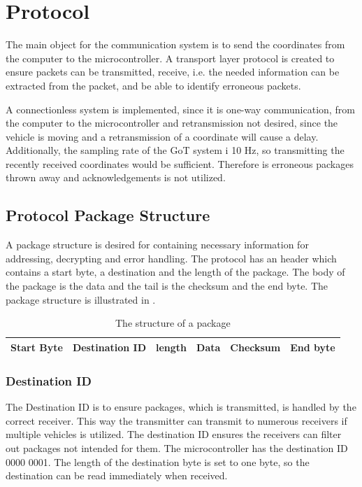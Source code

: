 \section{Protocol}\label{sec:Protocol}
The main object for the communication system is to send the coordinates from the computer to the microcontroller. A transport layer protocol is created to ensure packets can be transmitted, receive, i.e. the needed information can be extracted from the packet, and be able to identify erroneous packets.

A connectionless system is implemented, since it is one-way communication, from the computer to the microcontroller and retransmission not desired, since the vehicle is moving and a retransmission of a coordinate will cause a delay. Additionally, the sampling rate of the GoT system i 10 \si{Hz}, so transmitting the recently received coordinates would be sufficient. Therefore is erroneous packages thrown away and acknowledgements is not utilized.

\subsection{Protocol Package Structure}
A package structure is desired for containing necessary information for addressing, decrypting and error handling. The protocol has an header which contains a start byte, a destination and the length of the package. The body of the package is the data and the tail is the checksum and the end byte. The package structure is illustrated in .

\begin{table}[H]\centering
\begin{tabular}{|>{\centering\arraybackslash}m{2cm}|>{\centering\arraybackslash}m{3cm}|>{\centering\arraybackslash}m{2cm}|>{\centering\arraybackslash}m{2cm}|>{\centering\arraybackslash}m{2cm}|>{\centering\arraybackslash}m{2cm}|}
\hline
Start Byte & Destination ID & length & Data & Checksum & End byte \\
\hline
\end{tabular}
\caption{The structure of a package}
\label{CoorSetup}
\end{table}

\subsubsection{Destination ID}
The Destination ID is to ensure packages, which is transmitted, is handled by the correct receiver. This way the transmitter can transmit to numerous receivers if multiple vehicles is utilized. The destination ID ensures the receivers can filter out packages not intended for them. The microcontroller has the destination ID 0000 0001. The length of the destination byte is set to one byte, so the destination can be read immediately when received.

